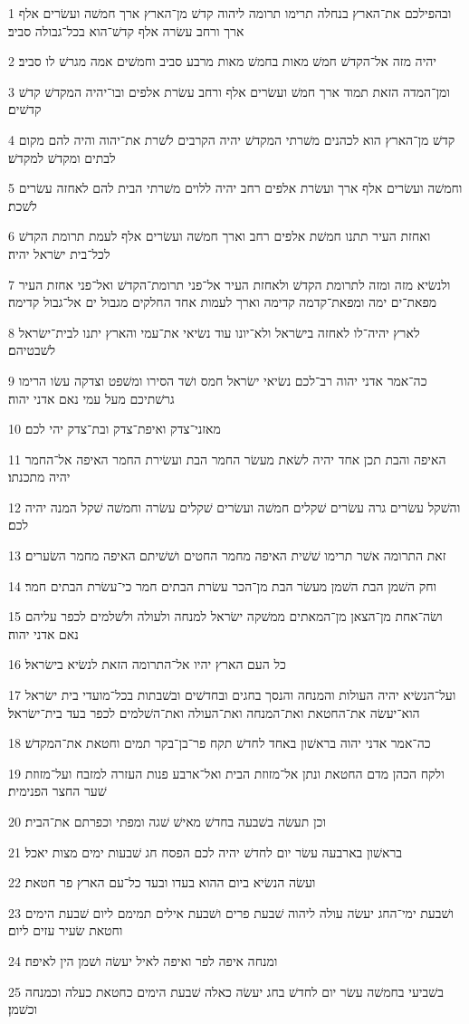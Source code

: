 \par 1 ובהפילכם את־הארץ בנחלה תרימו תרומה ליהוה קדשׁ מן־הארץ ארך חמשׁה ועשׂרים אלף ארך ורחב עשׂרה אלף קדשׁ־הוא בכל־גבולה סביב׃
\par 2 יהיה מזה אל־הקדשׁ חמשׁ מאות בחמשׁ מאות מרבע סביב וחמשׁים אמה מגרשׁ לו סביב׃
\par 3 ומן־המדה הזאת תמוד ארך חמשׁ ועשׂרים אלף ורחב עשׂרת אלפים ובו־יהיה המקדשׁ קדשׁ קדשׁים׃
\par 4 קדשׁ מן־הארץ הוא לכהנים משׁרתי המקדשׁ יהיה הקרבים לשׁרת את־יהוה והיה להם מקום לבתים ומקדשׁ למקדשׁ׃
\par 5 וחמשׁה ועשׂרים אלף ארך ועשׂרת אלפים רחב יהיה ללוים משׁרתי הבית להם לאחזה עשׂרים לשׁכת׃
\par 6 ואחזת העיר תתנו חמשׁת אלפים רחב וארך חמשׁה ועשׂרים אלף לעמת תרומת הקדשׁ לכל־בית ישׂראל יהיה׃
\par 7 ולנשׂיא מזה ומזה לתרומת הקדשׁ ולאחזת העיר אל־פני תרומת־הקדשׁ ואל־פני אחזת העיר מפאת־ים ימה ומפאת־קדמה קדימה וארך לעמות אחד החלקים מגבול ים אל־גבול קדימה׃
\par 8 לארץ יהיה־לו לאחזה בישׂראל ולא־יונו עוד נשׂיאי את־עמי והארץ יתנו לבית־ישׂראל לשׁבטיהם׃
\par 9 כה־אמר אדני יהוה רב־לכם נשׂיאי ישׂראל חמס ושׁד הסירו ומשׁפט וצדקה עשׂו הרימו גרשׁתיכם מעל עמי נאם אדני יהוה׃
\par 10 מאזני־צדק ואיפת־צדק ובת־צדק יהי לכם׃
\par 11 האיפה והבת תכן אחד יהיה לשׂאת מעשׂר החמר הבת ועשׂירת החמר האיפה אל־החמר יהיה מתכנתו׃
\par 12 והשׁקל עשׂרים גרה עשׂרים שׁקלים חמשׁה ועשׂרים שׁקלים עשׂרה וחמשׁה שׁקל המנה יהיה לכם׃
\par 13 זאת התרומה אשׁר תרימו שׁשׁית האיפה מחמר החטים ושׁשׁיתם האיפה מחמר השׂערים׃
\par 14 וחק השׁמן הבת השׁמן מעשׂר הבת מן־הכר עשׂרת הבתים חמר כי־עשׂרת הבתים חמר׃
\par 15 ושׂה־אחת מן־הצאן מן־המאתים ממשׁקה ישׂראל למנחה ולעולה ולשׁלמים לכפר עליהם נאם אדני יהוה׃
\par 16 כל העם הארץ יהיו אל־התרומה הזאת לנשׂיא בישׂראל׃
\par 17 ועל־הנשׂיא יהיה העולות והמנחה והנסך בחגים ובחדשׁים ובשׁבתות בכל־מועדי בית ישׂראל הוא־יעשׂה את־החטאת ואת־המנחה ואת־העולה ואת־השׁלמים לכפר בעד בית־ישׂראל׃
\par 18 כה־אמר אדני יהוה בראשׁון באחד לחדשׁ תקח פר־בן־בקר תמים וחטאת את־המקדשׁ׃
\par 19 ולקח הכהן מדם החטאת ונתן אל־מזוזת הבית ואל־ארבע פנות העזרה למזבח ועל־מזוזת שׁער החצר הפנימית׃
\par 20 וכן תעשׂה בשׁבעה בחדשׁ מאישׁ שׁגה ומפתי וכפרתם את־הבית׃
\par 21 בראשׁון בארבעה עשׂר יום לחדשׁ יהיה לכם הפסח חג שׁבעות ימים מצות יאכל׃
\par 22 ועשׂה הנשׂיא ביום ההוא בעדו ובעד כל־עם הארץ פר חטאת׃
\par 23 ושׁבעת ימי־החג יעשׂה עולה ליהוה שׁבעת פרים ושׁבעת אילים תמימם ליום שׁבעת הימים וחטאת שׂעיר עזים ליום׃
\par 24 ומנחה איפה לפר ואיפה לאיל יעשׂה ושׁמן הין לאיפה׃
\par 25 בשׁביעי בחמשׁה עשׂר יום לחדשׁ בחג יעשׂה כאלה שׁבעת הימים כחטאת כעלה וכמנחה וכשׁמן׃

